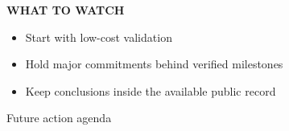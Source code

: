 \documentclass[10pt,a4paper]{article}
\begin{document}
\vspace{4pt}\noindent\begin{minipage}{\linewidth}
{\textcolor{BOGreen}{\scriptsize\bfseries WHAT TO WATCH}}\par\vspace{2pt}
{\footnotesize\begin{itemize}
\item Start with low-cost validation
\item Hold major commitments behind verified milestones
\item Keep conclusions inside the available public record
\end{itemize}}
\end{minipage}
\label{chap:8:end}

\clearpage
{\sffamily\fontsize{21}{26}\selectfont\color{BONavy} Future action agenda}\par\vspace{7pt}
\end{document}
